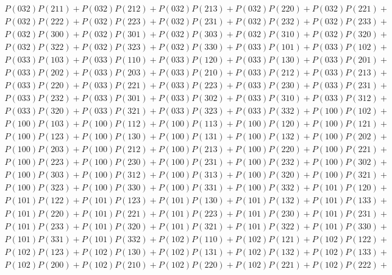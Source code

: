 \documentclass{article}
\theoremstyle{definition}
\begin{document}
\begin{gather*}
        P(032)P(211) + P(032)P(212) + P(032)P(213) + P(032)P(220) + P(032)P(221) +\\
        P(032)P(222) + P(032)P(223) + P(032)P(231) + P(032)P(232) + P(032)P(233) +\\
        P(032)P(300) + P(032)P(301) + P(032)P(303) + P(032)P(310) + P(032)P(320) +\\
        P(032)P(322) + P(032)P(323) + P(032)P(330) + P(033)P(101) + P(033)P(102) +\\
        P(033)P(103) + P(033)P(110) + P(033)P(120) + P(033)P(130) + P(033)P(201) +\\
        P(033)P(202) + P(033)P(203) + P(033)P(210) + P(033)P(212) + P(033)P(213) +\\
        P(033)P(220) + P(033)P(221) + P(033)P(223) + P(033)P(230) + P(033)P(231) +\\
        P(033)P(232) + P(033)P(301) + P(033)P(302) + P(033)P(310) + P(033)P(312) +\\
        P(033)P(320) + P(033)P(321) + P(033)P(323) + P(033)P(332) + P(100)P(102) +\\
        P(100)P(103) + P(100)P(112) + P(100)P(113) + P(100)P(120) + P(100)P(121) +\\
        P(100)P(123) + P(100)P(130) + P(100)P(131) + P(100)P(132) + P(100)P(202) +\\
        P(100)P(203) + P(100)P(212) + P(100)P(213) + P(100)P(220) + P(100)P(221) +\\
        P(100)P(223) + P(100)P(230) + P(100)P(231) + P(100)P(232) + P(100)P(302) +\\
        P(100)P(303) + P(100)P(312) + P(100)P(313) + P(100)P(320) + P(100)P(321) +\\
        P(100)P(323) + P(100)P(330) + P(100)P(331) + P(100)P(332) + P(101)P(120) +\\
        P(101)P(122) + P(101)P(123) + P(101)P(130) + P(101)P(132) + P(101)P(133) +\\
        P(101)P(220) + P(101)P(221) + P(101)P(223) + P(101)P(230) + P(101)P(231) +\\
        P(101)P(233) + P(101)P(320) + P(101)P(321) + P(101)P(322) + P(101)P(330) +\\
        P(101)P(331) + P(101)P(332) + P(102)P(110) + P(102)P(121) + P(102)P(122) +\\
        P(102)P(123) + P(102)P(130) + P(102)P(131) + P(102)P(132) + P(102)P(133) +\\
        P(102)P(200) + P(102)P(210) + P(102)P(220) + P(102)P(221) + P(102)P(222) +\\

\end{gather*}
\end{document}
